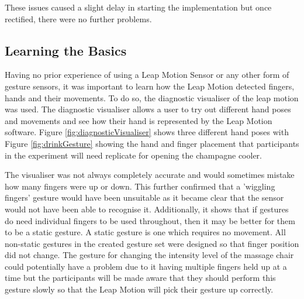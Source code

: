 \documentclass{l4proj}
\begin{document}
These issues caused a slight delay in starting the implementation but once rectified, there were no further problems.

\subsection{Learning the Basics}
Having no prior experience of using a Leap Motion Sensor or any other form of gesture sensors, it was important to learn how the Leap Motion detected fingers, hands and their movements. To do so, the diagnostic visualiser of the leap motion was used. The diagnostic visualiser allows a user to try out different hand poses and movements and see how their hand is represented by the Leap Motion software. Figure \ref{fig:diagnosticVisualiser} shows three different hand poses with Figure \ref{fig:drinkGesture} showing the hand and finger placement that participants in the experiment will need replicate for opening the champagne cooler. 

The visualiser was not always completely accurate and would sometimes mistake how many fingers were up or down. This further confirmed that a 'wiggling fingers' gesture would have been unsuitable as it became clear that the sensor would not have been able to recognise it. Additionally, it shows that if gestures do need individual fingers to be used throughout, then it may be better for them to be a static gesture. A static gesture is one which requires no movement. All non-static gestures in the created gesture set were designed so that finger position did not change.
The gesture for changing the intensity level of the massage chair could potentially have a problem due to it having multiple fingers held up at a time but the participants will be made aware that they should perform this gesture slowly so that the Leap Motion will pick their gesture up correctly.
\end{document}
